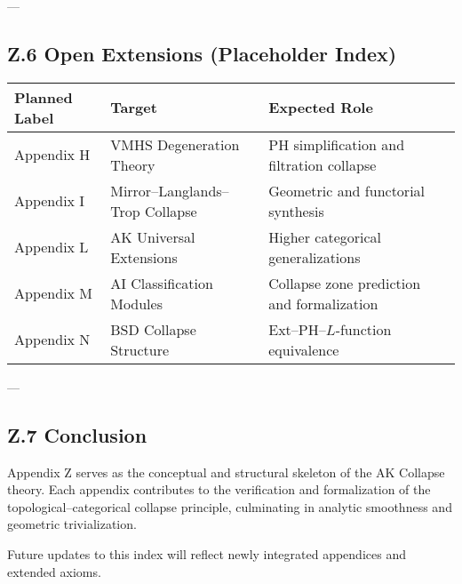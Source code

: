 \documentclass[11pt]{article}
\begin{document}
---

\subsection*{Z.6 Open Extensions (Placeholder Index)}

\begin{tabular}{lll}
\textbf{Planned Label} & \textbf{Target} & \textbf{Expected Role} \\
\hline
Appendix H & VMHS Degeneration Theory & PH simplification and filtration collapse \\
Appendix I & Mirror–Langlands–Trop Collapse & Geometric and functorial synthesis \\
Appendix L & AK Universal Extensions & Higher categorical generalizations \\
Appendix M & AI Classification Modules & Collapse zone prediction and formalization \\
Appendix N & BSD Collapse Structure & Ext–PH–$L$-function equivalence \\
\end{tabular}

---

\subsection*{Z.7 Conclusion}

Appendix Z serves as the conceptual and structural skeleton of the AK Collapse theory.  
Each appendix contributes to the verification and formalization of the topological–categorical collapse principle, culminating in analytic smoothness and geometric trivialization.

Future updates to this index will reflect newly integrated appendices and extended axioms.
\end{document}

